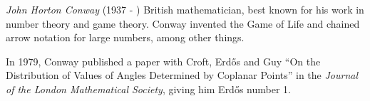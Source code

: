 \documentclass[12pt]{article}
\begin{document}
\emph{John Horton Conway} (1937 - ) British mathematician, best known for his work in number theory and game theory. Conway invented the Game of Life and chained arrow notation for large numbers, among other things.

In 1979, Conway published a paper with Croft, Erd\H{o}s and Guy ``On the Distribution of Values of Angles Determined by Coplanar Points'' in the {\it Journal of the London Mathematical Society}, giving him Erd\H{o}s number 1.
\end{document}
